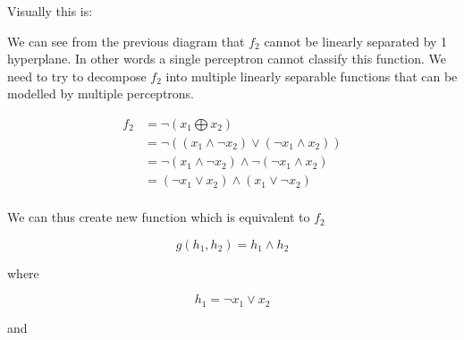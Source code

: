 \documentclass[10pt,a4paper]{article}
\begin{document}
Visually this is:

\begin{center}
\end{center}

We can see from the previous diagram that $f_2$ cannot be linearly separated by 1 hyperplane. In other words a single perceptron cannot classify this function. We need to try to decompose $f_2$ into multiple linearly separable functions that can be modelled by multiple perceptrons.

\begin{equation}
\begin{split}
f_2 &= \neg ( x_1 \bigoplus x_2 ) \\
    &= \neg( (x_1 \wedge \neg x_2) \vee (\neg x_1 \wedge x_2))\\
    &= \neg(x_1\wedge \neg x_2) \wedge \neg(\neg x_1 \wedge x_2)\\
    &= (\neg x_1 \vee x_2) \wedge (x_1 \vee \neg x_2)\\
\end{split}
\end{equation}  

We can thus create new function which is equivalent to $f_2$

\begin{equation}
g(h_1,h_2) = h_1 \wedge h_2 
\end{equation} 

where 

\begin{equation}
h_1 = \neg x_1 \vee x_2
\end{equation}

and 
\end{document}
